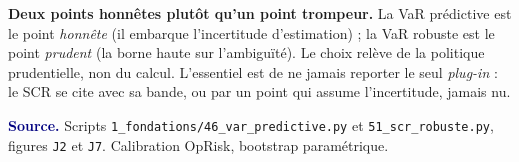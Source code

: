 \documentclass[11pt,a4paper]{article}
\begin{document}
\begin{cle}
\textbf{Deux points honnêtes plutôt qu'un point trompeur.} La VaR prédictive est le point
\emph{honnête} (il embarque l'incertitude d'estimation) ; la VaR robuste est le point
\emph{prudent} (la borne haute sur l'ambiguïté). Le choix relève de la politique prudentielle,
non du calcul. L'essentiel est de ne jamais reporter le seul \emph{plug-in} : le SCR se cite avec
sa bande, ou par un point qui assume l'incertitude, jamais nu.
\end{cle}

\smallskip
\noindent\footnotesize\textcolor{navy}{\textbf{Source.}} Scripts
\texttt{1\_fondations/46\_var\_predictive.py} et \texttt{51\_scr\_robuste.py}, figures
\texttt{J2} et \texttt{J7}. Calibration OpRisk, bootstrap paramétrique.
\end{document}
